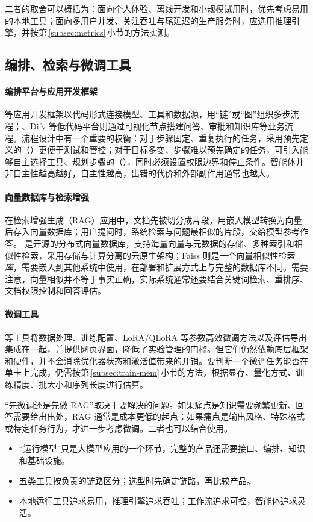 二者的取舍可以概括为：面向个人体验、离线开发和小规模试用时，优先考虑易用的本地工具；面向多用户并发、关注吞吐与尾延迟的生产服务时，应选用推理引擎，并按第\,\ref{subsec:metrics}\,小节的方法实测。

\subsection{编排、检索与微调工具}

\paragraph{编排平台与应用开发框架}  等应用开发框架以代码形式连接模型、工具和数据源，用“链”或“图”组织多步流程；、Dify 等低代码平台则通过可视化节点搭建问答、审批和知识库等业务流程。流程设计中有一个重要的权衡\cite{anthropic2024agents}：对于步骤固定、重复执行的任务，采用预先定义的（）更便于测试和管控；对于目标多变、步骤难以预先确定的任务，可引入能够自主选择工具、规划步骤的（），同时必须设置权限边界和停止条件。智能体并非自主性越高越好，自主性越高，出错的代价和外部副作用通常也越大。

\paragraph{向量数据库与检索增强} 在检索增强生成（RAG）应用中，文档先被切分成片段，用嵌入模型转换为向量后存入向量数据库；用户提问时，系统检索与问题最相似的片段，交给模型参考作答。 是开源的分布式向量数据库，支持海量向量与元数据的存储、多种索引和相似性检索，采用存储与计算分离的云原生架构\cite{milvus2024}；Faiss 则是一个向量相似性检索\emph{库}，需要嵌入到其他系统中使用，在部署和扩展方式上与完整的数据库不同。需要注意，向量相似并不等于事实正确，实际系统通常还要结合关键词检索、重排序、文档权限控制和回答评估。

\paragraph{微调工具}  等工具将数据处理、训练配置、LoRA/QLoRA 等参数高效微调方法\cite{hu2021lora,dettmers2023qlora}以及评估导出集成在一起，并提供网页界面，降低了实验管理的门槛。但它们仍然依赖底层框架和硬件，并不会消除优化器状态和激活值带来的开销。要判断一个微调任务能否在单卡上完成，仍需按第\,\ref{subsec:train-mem}\,小节的方法，根据显存、量化方式、训练精度、批大小和序列长度进行估算。

\begin{pitfall}
“先微调还是先做 RAG”取决于要解决的问题。如果痛点是知识需要频繁更新、回答需要给出出处，RAG 通常是成本更低的起点；如果痛点是输出风格、特殊格式或特定任务行为，才进一步考虑微调。二者也可以结合使用。
\end{pitfall}

\begin{keypoints}
\begin{itemize}[leftmargin=1.5em]
  \item “运行模型”只是大模型应用的一个环节，完整的产品还需要接口、编排、知识和基础设施。
  \item 五类工具按负责的链路区分；选型时先确定链路，再比较产品。
  \item 本地运行工具追求易用，推理引擎追求吞吐；工作流追求可控，智能体追求灵活。
\end{itemize}
\end{keypoints}
